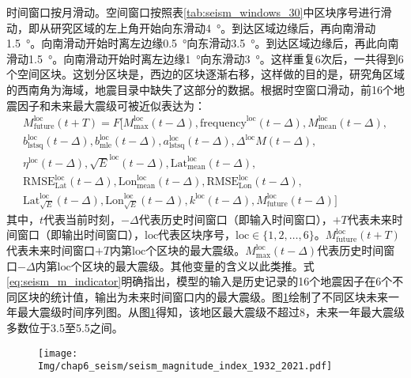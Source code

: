 时间窗口按月滑动。空间窗口按照表\ref{tab:seism_windows_30}中区块序号进行滑动，即从研究区域的左上角开始向东滑动\SI{4}{\degree}。到达区域边缘后，再向南滑动\SI{1.5}{\degree}。向南滑动开始时离左边缘\SI{0.5}{\degree}向东滑动\SI{3.5}{\degree}。到达区域边缘后，再此向南滑动\SI{1.5}{\degree}。向南滑动开始时离左边缘\SI{1}{\degree}向东滑动\SI{3}{\degree}。这样重复6次后，一共得到6个空间区块。这划分区块是，西边的区块逐渐右移，这样做的目的是，研究角区域的西南角为海域，地震目录中缺失了这部分的数据。根据时空窗口滑动，前16个地震因子和未来最大震级可被近似表达为：
\begin{equation}
  \label{eq:seism_m_indicator}
  \begin{split}
    M_{\mathrm{future}}^{\mathrm{loc}}(t+T)=F[M_{\mathrm{max}}^{\mathrm{loc}}(t-\Delta),\mathrm{frequency}^{\text{loc}}(t-\Delta),M_{\mathrm{mean}}^{\text{loc}}(t-\Delta),\\
    b_{\mathrm{lstsq}}^{\text{loc}}(t-\Delta),b_{\mathrm{mle}}^{\text{loc}}(t-\Delta),a_{\mathrm{lstsq}}^{\text{loc}}(t-\Delta),\Delta^{\text{loc}}M(t-\Delta),\\
    \eta^{\text{loc}}(t-\Delta),\sqrt{E}^{\text{loc}}(t-\Delta),\mathrm{Lat}_{\mathrm{mean}}^{\text{loc}}(t-\Delta),\\
    \mathrm{RMSE}_{\mathrm{Lat}}^{\text{loc}}(t-\Delta),\mathrm{Lon}_{\mathrm{mean}}^{\text{loc}}(t-\Delta),\mathrm{RMSE}_{\mathrm{Lon}}^{\text{loc}}(t-\Delta),\\
    \mathrm{Lat}^{\text{loc}}_{\sqrt{E}}(t-\Delta),\mathrm{Lon}^{\text{loc}}_{\sqrt{E}}(t-\Delta),k^{\text{loc}}(t-\Delta),M_{\mathrm{future}}^{\text{loc}}(t-\Delta)]
  \end{split}
\end{equation}
其中，$t$代表当前时刻，$-\Delta$代表历史时间窗口（即输入时间窗口），$+T$代表未来时间窗口（即输出时间窗口），$\text{loc}$代表区块序号，$\text{loc}\in\{1,2,\ldots,6\}$。$M_{\mathrm{future}}^{\text{loc}}(t+T)$代表未来时间窗口$+T$内第$\text{loc}$个区块的最大震级。$M_{\mathrm{max}}^{\mathrm{loc}}(t-\Delta)$代表历史时间窗口$-\Delta$内第$\text{loc}$个区块的最大震级。其他变量的含义以此类推。式\ref{eq:seism_m_indicator}明确指出，模型的输入是历史记录的16个地震因子在6个不同区块的统计值，输出为未来时间窗口内的最大震级。图\ref{fig:seism_magnitude_index_1932_2021}绘制了不同区块未来一年最大震级时间序列图。从图\ref{fig:seism_magnitude_index_1932_2021}得知，该地区最大震级不超过8，未来一年最大震级多数位于3.5至5.5之间。

\begin{figure}[!htbp]
  \centering
  \texttt{[image: Img/chap6\_seism/seism\_magnitude\_index\_1932\_2021.pdf]}
  \vspace{-2cm}
  \label{fig:seism_magnitude_index_1932_2021}
\end{figure}

